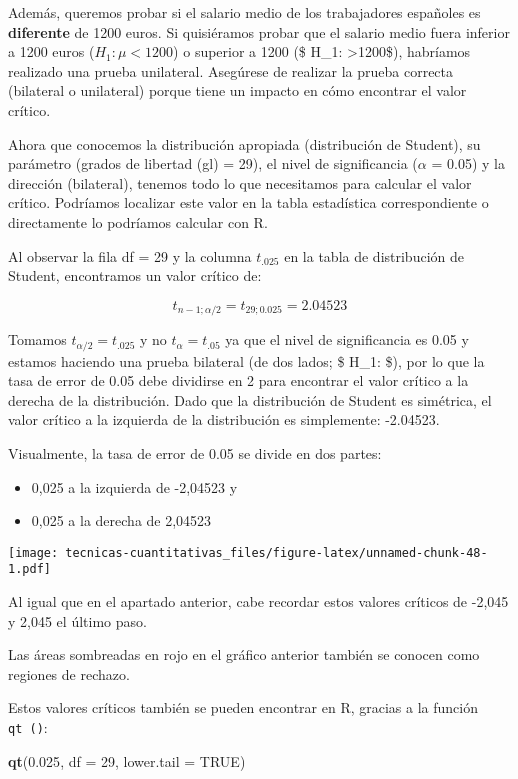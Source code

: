 \documentclass[
]{book}
\newenvironment{Shaded}{\begin{snugshade}}{\end{snugshade}}
\newcommand{\DataTypeTok}[1]{\textcolor[rgb]{0.13,0.29,0.53}{#1}}
\newcommand{\DecValTok}[1]{\textcolor[rgb]{0.00,0.00,0.81}{#1}}
\newcommand{\FloatTok}[1]{\textcolor[rgb]{0.00,0.00,0.81}{#1}}
\newcommand{\KeywordTok}[1]{\textcolor[rgb]{0.13,0.29,0.53}{\textbf{#1}}}
\newcommand{\NormalTok}[1]{#1}
\newcommand{\OtherTok}[1]{\textcolor[rgb]{0.56,0.35,0.01}{#1}}
\providecommand{\tightlist}{%
  \setlength{\itemsep}{0pt}\setlength{\parskip}{0pt}}
\begin{document}
Además, queremos probar si el salario medio de los trabajadores españoles es \textbf{diferente} de 1200 euros. Si quisiéramos probar que el salario medio fuera inferior a 1200 euros (\(H_1: \mu <1200\)) o superior a 1200 (\$ H\_1: \mu\textgreater1200\$), habríamos realizado una prueba unilateral. Asegúrese de realizar la prueba correcta (bilateral o unilateral) porque tiene un impacto en cómo encontrar el valor crítico.

Ahora que conocemos la distribución apropiada (distribución de Student), su parámetro (grados de libertad (gl) = 29), el nivel de significancia (\(\alpha\) = 0.05) y la dirección (bilateral), tenemos todo lo que necesitamos para calcular el valor crítico. Podríamos localizar este valor en la tabla estadística correspondiente o directamente lo podríamos calcular con R.

Al observar la fila df = 29 y la columna \(t_.025\) en la tabla de distribución de Student, encontramos un valor crítico de:

\[t_{n-1;\alpha/2} = t_{29; 0.025} = 2.04523\]

Tomamos \(t_{\alpha/2} = t_.025\) y no \(t_\alpha = t_.05\) ya que el nivel de significancia es 0.05 y estamos haciendo una prueba bilateral (de dos lados; \$ H\_1: \mu{}\$), por lo que la tasa de error de 0.05 debe dividirse en 2 para encontrar el valor crítico a la derecha de la distribución. Dado que la distribución de Student es simétrica, el valor crítico a la izquierda de la distribución es simplemente: -2.04523.

Visualmente, la tasa de error de 0.05 se divide en dos partes:

\begin{itemize}
\tightlist
\item
  0,025 a la izquierda de -2,04523 y
\item
  0,025 a la derecha de 2,04523
\end{itemize}

\texttt{[image: tecnicas-cuantitativas\_files/figure-latex/unnamed-chunk-48-1.pdf]}

Al igual que en el apartado anterior, cabe recordar estos valores críticos de -2,045 y 2,045 el último paso.

Las áreas sombreadas en rojo en el gráfico anterior también se conocen como regiones de rechazo.

Estos valores críticos también se pueden encontrar en R, gracias a la función \texttt{qt\ ()}:

\begin{Shaded}
\begin{Highlighting}[]
\KeywordTok{qt}\NormalTok{(}\FloatTok{0.025}\NormalTok{, }\DataTypeTok{df =} \DecValTok{29}\NormalTok{, }\DataTypeTok{lower.tail =} \OtherTok{TRUE}\NormalTok{)}
\end{Highlighting}
\end{Shaded}
\end{document}
